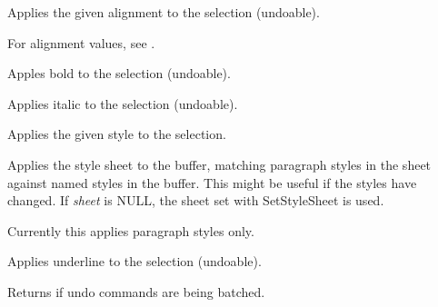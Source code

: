 \label{wxrichtextctrlapplyalignmenttoselection}


Applies the given alignment to the selection (undoable).

For alignment values, see .

\label{wxrichtextctrlapplyboldtoselection}


Apples bold to the selection (undoable).

\label{wxrichtextctrlapplyitalictoselection}


Applies italic to the selection (undoable).

\label{wxrichtextctrlapplystyle}


Applies the given style to the selection.

\label{wxrichtextctrlapplystylesheet}


Applies the style sheet to the buffer, matching paragraph styles in the sheet against named styles
in the buffer. This might be useful if the styles have changed. If {\it sheet} is NULL, the
sheet set with SetStyleSheet is used.

Currently this applies paragraph styles only.

\label{wxrichtextctrlapplyunderlinetoselection}


Applies underline to the selection (undoable).

\label{wxrichtextctrlbatchingundo}


Returns \true if undo commands are being batched.

\label{wxrichtextctrlbeginalignment}

